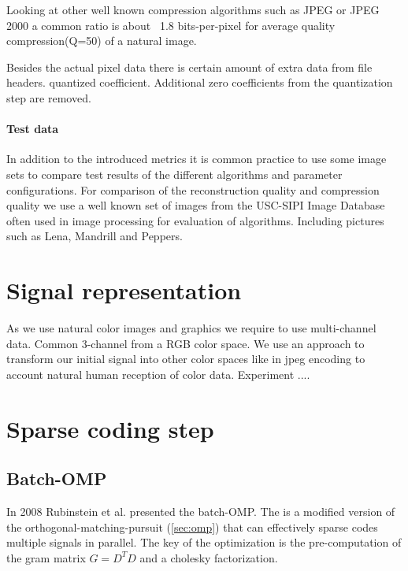 Looking at other well known compression algorithms such as JPEG or JPEG 2000
a common ratio is about ~1.8 bits-per-pixel for average quality
compression(Q=50) of a natural image. 

Besides the actual pixel data there is certain amount of extra data from file
headers. 
quantized coefficient. Additional zero coefficients from the quantization step
are removed.

\paragraph{Test data}
In addition to the introduced metrics it is common practice to use some image
sets to compare test results of the different algorithms and parameter
configurations. For comparison of the reconstruction quality and compression
quality we use a well known set of images from the USC-SIPI Image Database often
used in image processing for evaluation of algorithms. Including pictures such
as Lena, Mandrill and Peppers.

\section{Signal representation}
\label{sec:signal_representation}
As we use natural color images and graphics we require to use multi-channel
data. Common 3-channel from a RGB color space. %
We use an approach to transform our initial signal into other color spaces like
in jpeg encoding to account natural human reception of color data. Experiment
....


\section{Sparse coding step}
\subsection{Batch-OMP}
In 2008 Rubinstein et al.\cite{Rubinstein2008} presented the batch-OMP. The
 is a modified version of the
orthogonal-matching-pursuit (\ref{sec:omp}) that can effectively sparse codes
multiple signals in parallel. The key of the optimization is the pre-computation
of the gram matrix $G=D^TD$ and a cholesky factorization.

